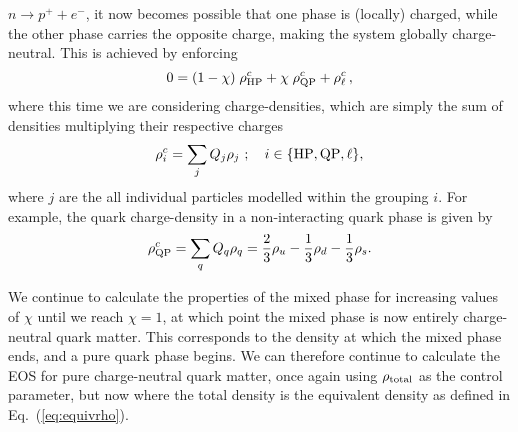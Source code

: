 \documentclass[11pt,a4paper,twoside]{carrollthesis}
\newcommand{\be}{\begin{equation}}
\newcommand{\ee}{\end{equation}}
\newcommand{\reci}[1]{\frac{1}{#1}}
\begin{document}
$n\to p^+ + e^-$, it now becomes possible that one phase is (locally)
charged, while the other phase carries the opposite charge, making the
system globally charge-neutral. This is achieved by enforcing
%
\be \label{eq:mp_charge}
0 = (1-\chi)\; \rho^c_{\rm HP} + \chi\; \rho^c_{\rm QP} + 
\rho^c_{\ell} \, ,
\ee
%
where this time we are considering charge-densities, which are simply
the sum of densities multiplying their respective charges
%
\be \rho^c_i = \sum_j Q_j \rho_j \ ; \quad i \in \{{\rm HP},{\rm
  QP},\ell\}, \ee
%
where $j$ are the all individual particles modelled within the
grouping $i$. For example, the quark charge-density in a non-interacting
quark phase is given by
%
\be \label{eq:qp_charge} \rho^c_{\rm QP} = \sum_q Q_q \rho_q =
\frac{2}{3}\rho_u - \reci{3}\rho_d - \reci{3}\rho_s.  \ee
%
\par
%
We continue to calculate the properties of the mixed phase for
increasing values of $\chi$ until we reach $\chi = 1$, at which point
the mixed phase is now entirely charge-neutral quark matter. This
corresponds to the density at which the mixed phase ends, and a pure
quark phase begins. We can therefore continue to calculate the EOS for
pure charge-neutral quark matter, once again using $\rho_{\rm total}$
as the control parameter, but now where the total density is the
equivalent density as defined in Eq.~(\ref{eq:equivrho}).\par
%
\end{document}
